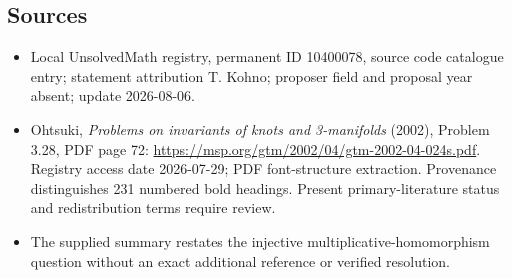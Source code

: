 \documentclass[11pt]{article}
\begin{document}
\subsection{Sources}
\begin{itemize}
\item Local UnsolvedMath registry, permanent ID 10400078, source code catalogue entry; statement attribution T. Kohno; proposer field and proposal year absent; update 2026-08-06.
\item Ohtsuki, \emph{Problems on invariants of knots and 3-manifolds} (2002), Problem 3.28, PDF page 72: \url{https://msp.org/gtm/2002/04/gtm-2002-04-024s.pdf}. Registry access date 2026-07-29; PDF font-structure extraction. Provenance distinguishes 231 numbered bold headings. Present primary-literature status and redistribution terms require review.
\item The supplied summary restates the injective multiplicative-homomorphism question without an exact additional reference or verified resolution.
\end{itemize}
\end{document}
